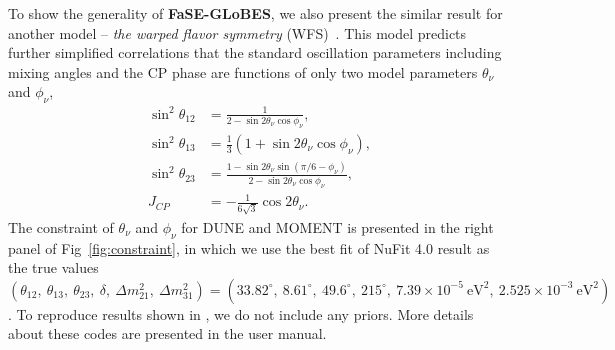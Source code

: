 \documentclass[aps,prd,nofootinbib,preprint]{revtex4}
\begin{document}


To show the generality of \textbf{FaSE-GLoBES}, we also present the similar result for another model -- \textit{the warped flavor symmetry} (WFS)~\cite{Chen:2015jta}. This model predicts further simplified correlations that the standard oscillation parameters including mixing angles and the CP phase are functions of only two model parameters $\theta_\nu$ and $\phi_\nu$,
\begin{align}\label{eq:WFS}
\sin^2\theta_{12}&=\frac{1}{2-\sin2\theta_{\nu}\cos\phi_\nu},\nonumber\\
\sin^2\theta_{13}&=\frac{1}{3}(1+\sin2\theta_\nu\cos\phi_\nu),\nonumber\\
\sin^2\theta_{23}&=\frac{1-\sin2\theta_\nu\sin(\pi/6-\phi_\nu)}{2-\sin2\theta_\nu\cos\phi_\nu},\nonumber\\
J_{CP}&=-\frac{1}{6\sqrt{3}}\cos2\theta_\nu.
\end{align}
The constraint of $\theta_\nu$ and $\phi_\nu$ for DUNE and MOMENT is presented in the right panel of Fig~\ref{fig:constraint}, in which we use the best fit of NuFit 4.0 result as the true values $(\theta_{12},~\theta_{13},~\theta_{23},~\delta,~\Delta m_{21}^2,~\Delta m_{31}^2)=(33.82^\circ,~8.61^\circ,~49.6^\circ,~215^\circ,~7.39\times10^{-5}~\text{eV}^2,~2.525\times10^{-3}~\text{eV}^2)$. To reproduce results shown in \cite{Chatterjee:2017xkb}, we do not include any priors. More details about these codes are presented in the user manual. 
\end{document}
